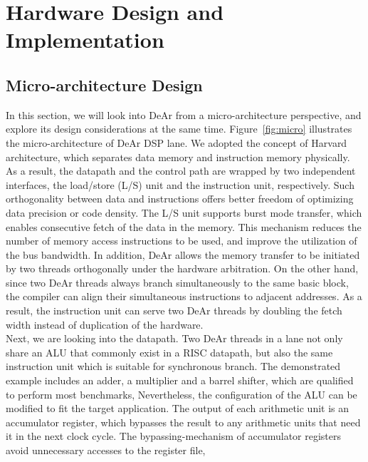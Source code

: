 

\section{Hardware Design and Implementation}
\subsection{Micro-architecture Design}
In this section, we will look into DeAr from a micro-architecture perspective, and explore its design considerations at the same time.
Figure~\ref{fig:micro} illustrates the micro-architecture of DeAr DSP lane.
We adopted the concept of Harvard architecture, 
which separates data memory and instruction memory physically\cite{harvard}.
As a result, the datapath and the control path are wrapped by two independent interfaces, the load/store (L/S) unit and the instruction unit, respectively.
Such orthogonality between data and instructions offers better freedom of optimizing data precision or code density.
The L/S unit supports burst mode transfer, which enables consecutive fetch of the data in the memory.
This mechanism reduces the number of memory access instructions to be used, 
and improve the utilization of the bus bandwidth.
In addition, DeAr allows the memory transfer to be initiated by two threads orthogonally under the hardware arbitration.
On the other hand, since two DeAr threads always branch simultaneously to the same basic block, 
the compiler can align their simultaneous instructions to adjacent addresses.
As a result, the instruction unit can serve two DeAr threads by doubling the fetch width instead of duplication of the hardware.
\\\indent
Next, we are looking into the datapath.
Two DeAr threads in a lane not only share an ALU that commonly exist in a RISC datapath, 
but also the same instruction unit which is suitable for synchronous branch.
The demonstrated example includes an adder, a multiplier and a barrel shifter, which are qualified to perform most benchmarks,
Nevertheless, the configuration of the ALU can be modified to fit the target application.
The output of each arithmetic unit is an accumulator register, 
which bypasses the result to any arithmetic units that need it in the next clock cycle.
The bypassing-mechanism of accumulator registers avoid unnecessary accesses to the register file, 
